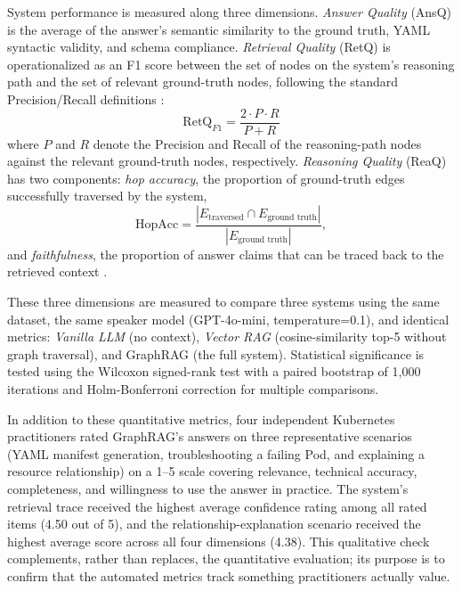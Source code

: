 \documentclass{ieeeaccess}
\begin{document}
System performance is measured along three dimensions. \textit{Answer Quality} (AnsQ) is the average of the answer's semantic similarity to the ground truth, YAML syntactic validity, and schema compliance. \textit{Retrieval Quality} (RetQ) is operationalized as an F1 score between the set of nodes on the system's reasoning path and the set of relevant ground-truth nodes, following the standard Precision/Recall definitions \cite{manning_ir_2008}:
\begin{equation}
\text{RetQ}_{F1} = \frac{2 \cdot P \cdot R}{P + R}
\label{eq:f1}
\end{equation}
where $P$ and $R$ denote the Precision and Recall of the reasoning-path nodes against the relevant ground-truth nodes, respectively. \textit{Reasoning Quality} (ReaQ) has two components: \textit{hop accuracy}, the proportion of ground-truth edges successfully traversed by the system,
\begin{equation}
\text{HopAcc} = \frac{|E_{\text{traversed}} \cap E_{\text{ground truth}}|}{|E_{\text{ground truth}}|},
\label{eq:hopacc}
\end{equation}
and \textit{faithfulness}, the proportion of answer claims that can be traced back to the retrieved context \cite{es_ragas_2023}.

These three dimensions are measured to compare three systems using the same dataset, the same speaker model (GPT-4o-mini, temperature=0.1), and identical metrics: \textit{Vanilla LLM} (no context), \textit{Vector RAG} (cosine-similarity top-5 without graph traversal), and GraphRAG (the full system). Statistical significance is tested using the Wilcoxon signed-rank test with a paired bootstrap of 1,000 iterations and Holm-Bonferroni correction for multiple comparisons.

In addition to these quantitative metrics, four independent Kubernetes practitioners rated GraphRAG's answers on three representative scenarios (YAML manifest generation, troubleshooting a failing Pod, and explaining a resource relationship) on a 1--5 scale covering relevance, technical accuracy, completeness, and willingness to use the answer in practice. The system's retrieval trace received the highest average confidence rating among all rated items (4.50 out of 5), and the relationship-explanation scenario received the highest average score across all four dimensions (4.38). This qualitative check complements, rather than replaces, the quantitative evaluation; its purpose is to confirm that the automated metrics track something practitioners actually value.
\end{document}
